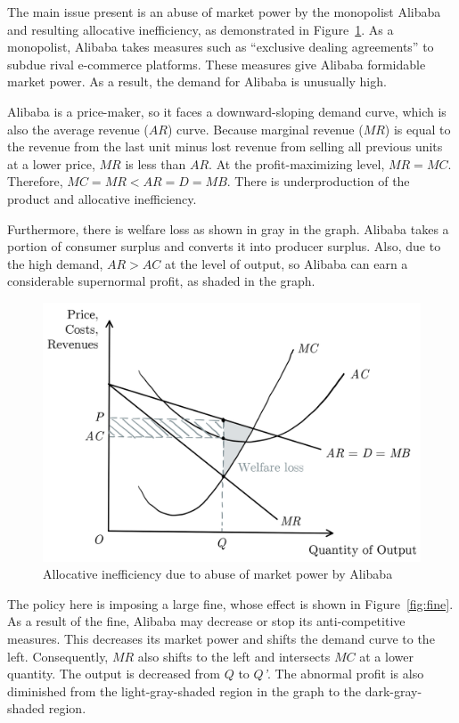 \documentclass{article}
\begin{document}
\vspace{1cm}

The main issue present is an abuse of market power by the monopolist Alibaba and resulting allocative inefficiency, as demonstrated in Figure~\ref{fig:monopoly}. As a monopolist, Alibaba takes measures such as ``exclusive dealing agreements'' to subdue rival e-commerce platforms. These measures give Alibaba formidable market power. As a result, the demand for Alibaba is unusually high. 

Alibaba is a price-maker, so it faces a downward-sloping demand curve, which is also the average revenue ($AR$) curve. Because marginal revenue ($MR$) is equal to the revenue from the last unit minus lost revenue from selling all previous units at a lower price, $MR$ is less than $AR$. At the profit-maximizing level, $MR = MC$. Therefore, $MC = MR < AR = D = MB$. There is underproduction of the product and allocative inefficiency.

Furthermore, there is welfare loss as shown in gray in the graph. Alibaba takes a portion of consumer surplus and converts it into producer surplus. Also, due to the high demand, $AR > AC$ at the level of output, so Alibaba can earn a considerable supernormal profit, as shaded in the graph. 

\begin{figure}[htbp]
	\centering
	\includegraphics[width=0.6\linewidth]{monopoly.png}
	\caption{Allocative inefficiency due to abuse of market power by Alibaba}
	\label{fig:monopoly}
\end{figure}

\vspace{0.5cm}

The policy here is imposing a large fine, whose effect is shown in Figure~\ref{fig:fine}. As a result of the fine, Alibaba may decrease or stop its anti-competitive measures. This decreases its market power and shifts the demand curve to the left. Consequently, $MR$ also shifts to the left and intersects $MC$ at a lower quantity. The output is decreased from $Q$ to $Q$\textit{'}. The abnormal profit is also diminished from the light-gray-shaded region in the graph to the dark-gray-shaded region.
\end{document}
